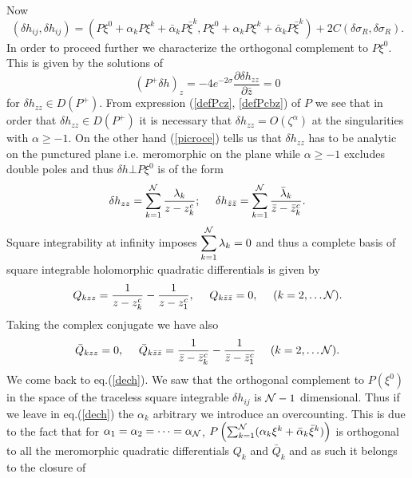 \documentclass[a4paper,12pt]{article}
\begin{document}
Now
\begin{equation}
(\delta h_{ij}, \delta h_{ij}) = 
(P\xi^0+\alpha_k P\xi^{k}+\bar\alpha_k P\bar\xi^{k}, P\xi^0+\alpha_k
P\xi^{k}+ \bar\alpha_k P\bar\xi^{k})+ 
2C(\delta\sigma_R, \delta\sigma_R).
\end{equation}
In order to proceed further we characterize the orthogonal complement
to $P\xi^0$. This is given by the solutions of
\begin{equation}\label{picroce}
(P^+\delta h)_z = - 4e^{-2 \sigma}\frac{\partial \delta
h_{zz}}{\partial \bar z}=0 
\end{equation}
for $\delta h_{zz}\in D(P^+)$. From expression (\ref{defPcz},
\ref{defPcbz}) 
of $P$ we see that in order that $\delta h_{zz}\in D(P^+)$ it is necessary
that $\delta h_{zz}=O(\zeta^\alpha)$ at the singularities with $\alpha
\geq -1$. On the other hand (\ref{picroce}) tells us that $\delta h_{zz}$
has to 
be analytic 
on the punctured plane i.e. meromorphic on the plane while $\alpha
\geq -1$
excludes double poles and thus $\delta h \bot P\xi^0$ is of the form
\begin{equation}
\delta h_{z z} =\sum_{k=1}^{\cal N}\frac{\lambda_k}{z-
z^c_k};~~~~\delta h_{\bar z \bar z} =\sum_{k=1}^{\cal N}\frac{\bar
\lambda_k}{\bar z- \bar z^c_k}. 
\end{equation} 
Square integrability at infinity imposes
$\displaystyle{\sum_{k=1}^{\cal N}\lambda_k =0}$ 
and thus a complete basis of square integrable
holomorphic quadratic differentials is given by
\begin{equation}\label{Qbase1}
Q_{kzz}=\frac{1}{z-z^c_k}-\frac{1}{ z-z^c_1},
~~~~Q_{k\bar z \bar z}=0,~~~~(k=2,\dots {\cal N}).
\end{equation}
Taking the complex conjugate we have also
\begin{equation}\label{Qbase2}
\bar Q_{kzz}=0,~~~~\bar Q_{k\bar z \bar z}=\frac{1}{\bar z-\bar
z^c_k}-\frac{1}{\bar z-\bar z^c_1}~~~~(k=2,\dots {\cal N}).
\end{equation}
We come back to eq.(\ref{dech}). We saw that the orthogonal complement
to $P(\xi^0)$ in the space of the traceless square integrable $\delta
h_{ij}$ is ${\cal N}-1$ dimensional. Thus if we leave in
eq.(\ref{dech}) the $\alpha_k$ arbitrary we introduce an overcounting.
This is due to the fact that for $\alpha_1=\alpha_2=\dots=\alpha_{\cal
N}$, $P\left(\sum_{k=1}^{\cal
N}(\alpha_k\xi^{k}+\bar\alpha_k\bar\xi^{k})\right)$ is 
orthogonal to all 
the meromorphic 
quadratic differentials $Q_k$ and $\bar Q_k$ and as such it belongs to
the closure of 
\end{document}

